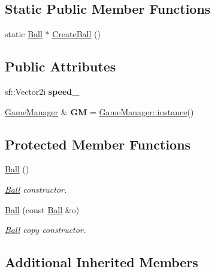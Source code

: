 \subsection*{Static Public Member Functions}
\begin{DoxyCompactItemize}
\item 
static \hyperlink{class_ball}{Ball} $\ast$ \hyperlink{class_ball_a2b93a708ec2a680459ef59979eb8b070}{Create\+Ball} ()
\end{DoxyCompactItemize}
\subsection*{Public Attributes}
\begin{DoxyCompactItemize}
\item 
\mbox{\label{class_ball_a0da8727a1581537a062d580caa8fa0d6}} 
sf\+::\+Vector2i {\bfseries speed\+\_\+}
\item 
\mbox{\label{class_ball_ab45d162868bc2a245ab32034c1ec03a9}} 
\hyperlink{class_game_manager}{Game\+Manager} \& {\bfseries GM} = \hyperlink{class_game_manager_afa37ab23c040b5225d567d4c9ab854e1}{Game\+Manager\+::instance}()
\end{DoxyCompactItemize}
\subsection*{Protected Member Functions}
\begin{DoxyCompactItemize}
\item 
\hyperlink{class_ball_a86a144d3dad6c953e422e32435923bbb}{Ball} ()
\begin{DoxyCompactList}\small\item\em \hyperlink{class_ball}{Ball} constructor. \end{DoxyCompactList}\item 
\hyperlink{class_ball_a6587e385ce0f6bfd3772368159e54271}{Ball} (const \hyperlink{class_ball}{Ball} \&o)
\begin{DoxyCompactList}\small\item\em \hyperlink{class_ball}{Ball} copy constructor. \end{DoxyCompactList}\end{DoxyCompactItemize}
\subsection*{Additional Inherited Members}


